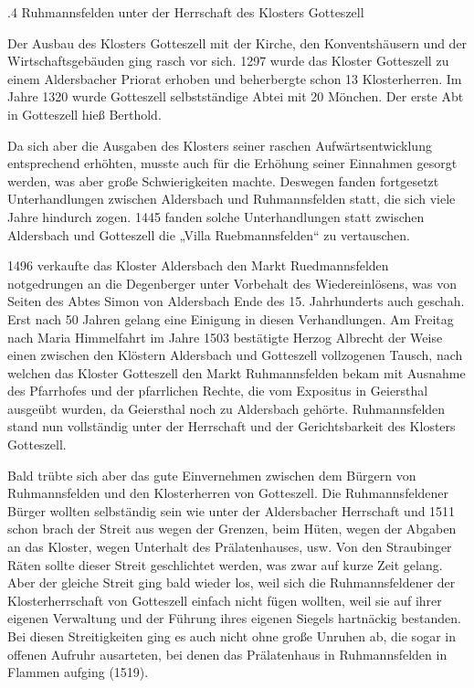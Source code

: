 .4 Ruhmannsfelden unter der Herrschaft des Klosters Gotteszell

Der Ausbau des Klosters Gotteszell mit der Kirche, den Konventshäusern und der
Wirtschaftsgebäuden ging rasch vor sich. 1297 wurde das Kloster Gotteszell zu
einem Aldersbacher Priorat erhoben und beherbergte schon 13 Klosterherren. Im
Jahre 1320 wurde Gotteszell selbstständige Abtei mit 20 Mönchen. Der erste Abt
in Gotteszell hieß Berthold.

Da sich aber die Ausgaben des Klosters seiner raschen Aufwärtsentwicklung
entsprechend erhöhten, musste auch für die Erhöhung seiner Einnahmen gesorgt
werden, was aber große Schwierigkeiten machte. Deswegen fanden fortgesetzt
Unterhandlungen zwischen Aldersbach und Ruhmannsfelden statt, die sich viele
Jahre hindurch zogen. 1445 fanden solche Unterhandlungen statt zwischen
Aldersbach und Gotteszell die „Villa Ruebmannsfelden“ zu vertauschen.

1496 verkaufte das Kloster Aldersbach den Markt Ruedmannsfelden notgedrungen an
die Degenberger unter Vorbehalt des Wiedereinlösens, was von Seiten des Abtes
Simon von Aldersbach Ende des 15. Jahrhunderts auch geschah. Erst nach 50 Jahren
gelang eine Einigung in diesen Verhandlungen. Am Freitag nach Maria Himmelfahrt
im Jahre 1503 bestätigte Herzog Albrecht der Weise einen zwischen den Klöstern
Aldersbach und Gotteszell vollzogenen Tausch, nach welchen das Kloster
Gotteszell den Markt Ruhmannsfelden bekam mit Ausnahme des Pfarrhofes und der
pfarrlichen Rechte, die vom Expositus in Geiersthal ausgeübt wurden, da
Geiersthal noch zu Aldersbach gehörte. Ruhmannsfelden stand nun vollständig
unter der Herrschaft und der Gerichtsbarkeit des Klosters Gotteszell.

Bald trübte sich aber das gute Einvernehmen zwischen dem Bürgern von
Ruhmannsfelden und den Klosterherren von Gotteszell. Die Ruhmannsfeldener Bürger
wollten selbständig sein wie unter der Aldersbacher Herrschaft und 1511 schon
brach der Streit aus wegen der Grenzen, beim Hüten, wegen der Abgaben an das
Kloster, wegen Unterhalt des Prälatenhauses, usw. Von den Straubinger Räten
sollte dieser Streit geschlichtet werden, was zwar auf kurze Zeit gelang. Aber
der gleiche Streit ging bald wieder los, weil sich die Ruhmannsfeldener der
Klosterherrschaft von Gotteszell einfach nicht fügen wollten, weil sie auf ihrer
eigenen Verwaltung und der Führung ihres eigenen Siegels hartnäckig bestanden.
Bei diesen Streitigkeiten ging es auch nicht ohne große Unruhen ab, die sogar in
offenen Aufruhr ausarteten, bei denen das Prälatenhaus in Ruhmannsfelden in
Flammen aufging (1519).

